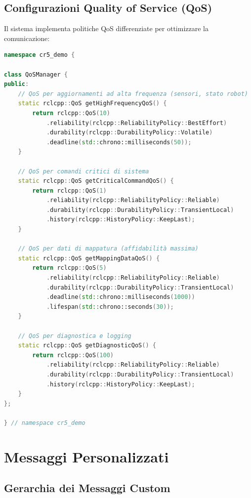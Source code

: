 \documentclass[12pt,a4paper,twoside,openright]{book}
\begin{document}
\subsection{Configurazioni Quality of Service (QoS)}

Il sistema implementa politiche QoS differenziate per ottimizzare la comunicazione:

\begin{lstlisting}[language=C++, caption={Configurazioni QoS ottimizzate per diversi scenari}]
namespace cr5_demo {

class QoSManager {
public:
    // QoS per aggiornamenti ad alta frequenza (sensori, stato robot)
    static rclcpp::QoS getHighFrequencyQoS() {
        return rclcpp::QoS(10)
            .reliability(rclcpp::ReliabilityPolicy::BestEffort)
            .durability(rclcpp::DurabilityPolicy::Volatile)
            .deadline(std::chrono::milliseconds(50));
    }
    
    // QoS per comandi critici di sistema
    static rclcpp::QoS getCriticalCommandQoS() {
        return rclcpp::QoS(1)
            .reliability(rclcpp::ReliabilityPolicy::Reliable)
            .durability(rclcpp::DurabilityPolicy::TransientLocal)
            .history(rclcpp::HistoryPolicy::KeepLast);
    }
    
    // QoS per dati di mappatura (affidabilità massima)
    static rclcpp::QoS getMappingDataQoS() {
        return rclcpp::QoS(5)
            .reliability(rclcpp::ReliabilityPolicy::Reliable)
            .durability(rclcpp::DurabilityPolicy::TransientLocal)
            .deadline(std::chrono::milliseconds(1000))
            .lifespan(std::chrono::seconds(30));
    }
    
    // QoS per diagnostica e logging
    static rclcpp::QoS getDiagnosticQoS() {
        return rclcpp::QoS(100)
            .reliability(rclcpp::ReliabilityPolicy::Reliable)
            .durability(rclcpp::DurabilityPolicy::TransientLocal)
            .history(rclcpp::HistoryPolicy::KeepLast);
    }
};

} // namespace cr5_demo
\end{lstlisting}

\section{Messaggi Personalizzati}

\subsection{Gerarchia dei Messaggi Custom}
\end{document}

